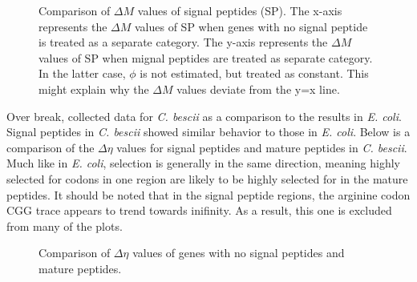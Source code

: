 \documentclass[11pt]{labbook}
\begin{document}
\begin{figure}
\caption{Comparison of $\Delta\mathit{M}$ values of signal peptides (SP). The x-axis represents the $\Delta\mathit{M}$ values of SP when genes with no signal peptide is treated as a separate category. The y-axis represents the $\Delta\mathit{M}$ values of SP when mignal peptides are treated as separate category. In the latter case, $\phi$ is not estimated, but treated as constant. This might explain why the $\Delta\mathit{M}$ values deviate from the y=x line.}
\end{figure}


Over break, collected data for \textit{C. bescii} as a comparison to the results in \textit{E. coli}. Signal peptides in \textit{C. bescii} showed similar behavior to those in \textit{E. coli}. Below is a comparison of the $\Delta\eta$ values for signal peptides and mature peptides in \textit{C. bescii}. Much like in \textit{E. coli}, selection is generally in the same direction, meaning highly selected for codons in one region are likely to be highly selected for in the mature peptides. It should be noted that in the signal peptide regions, the arginine codon CGG trace appears to trend towards inifinity. As a result, this one is excluded from many of the plots. 

\begin{figure}
\caption{Comparison of $\Delta\eta$ values of genes with no signal peptides and mature peptides.}
\end{figure}
\end{document}

